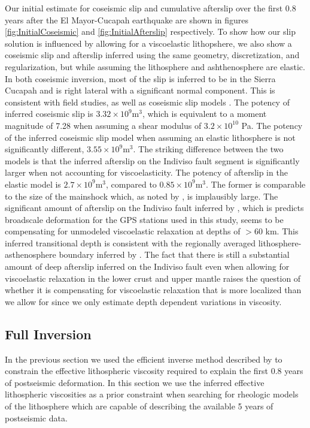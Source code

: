 \documentclass[12pt]{article}
\begin{document}
Our initial estimate for coseismic slip and cumulative afterslip over the first 0.8 years after the El Mayor-Cucapah earthquake are shown in figures \ref{fig:InitialCoseismic} and \ref{fig:InitialAfterslip} respectively. To show how our slip solution is influenced by allowing for a viscoelastic lithopshere, we also show a coseismic slip and afterslip inferred using the same geometry, discretization, and regularization, but while assuming the lithosphere and ashthenosphere are elastic.  In both coseismic inversion, most of the slip is inferred to be in the Sierra Cucapah and is right lateral with a significant normal component. This is consistent with field studies, \cite{Fletcher2014} as well as coseismic slip models \cite{Wei2011}.  The potency of inferred coseismic slip is $3.32\times 10^{9} \mathrm{m}^3$, which is equivalent to a moment magnitude of 7.28 when assuming a shear modulus of $3.2\times10^{10}$ Pa. The potency of the inferred coseismic slip model when assuming an elastic lithosphere is not significantly different, $3.55\times 10^9 \mathrm{m}^3$.  The striking difference between the two models is that the inferred afterslip on the Indiviso fault segment is significantly larger when not accounting for viscoelasticity.  The potency of afterslip in the elastic model is $2.7\times 10^9 \mathrm{m}^3$, compared to $0.85\times 10^9 \mathrm{m}^3$.  The former is comparable to the size of the mainshock which, as noted by \cite{Rollins2015}, is implausibly large. The significant amount of afterslip on the Indiviso fault inferred by \cite{Rollins2015}, which is predicts broadscale deformation for the GPS stations used in this study, seems to be compensating for unmodeled viscoelastic relaxation at depths of $>60$ km. This inferred transitional depth is consistent with the regionally averaged lithosphere-asthenosphere boundary inferred by \cite{Lekic2011}.  The fact that there is still a substantial amount of deep afterslip inferred on the Indiviso fault even when allowing for viscoelastic relaxation in the lower crust and upper mantle raises the question of whether it is compensating for viscoelastic relaxation that is more localized than we allow for since we only estimate depth dependent variations in viscosity.  
 
 
\subsection{Full Inversion}\label{FullInversion} 

In the previous section we used the efficient inverse method described by \cite{Hines2015} to constrain the effective lithospheric viscosity required to explain the first 0.8 years of postseismic deformation. In this section we use the inferred effective lithospheric viscosities as a prior constraint when searching for rheologic models of the lithosphere which are capable of describing the available 5 years of postseismic data.   
\end{document}
